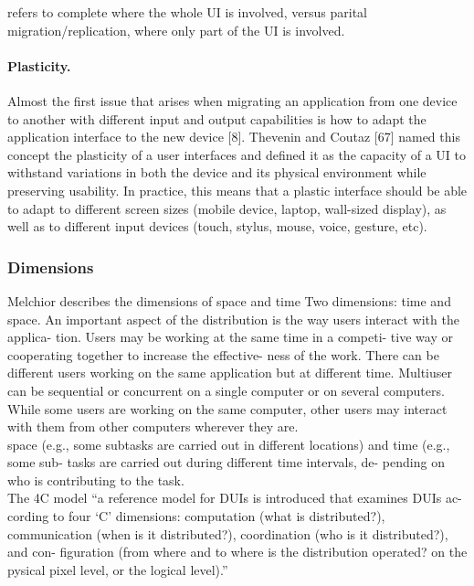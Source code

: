 \cite{blumendorf2011distributed} refers to complete where the whole UI is
involved,  versus parital migration/replication, where only part of the UI is
involved.

\paragraph{Plasticity.}
\cite{elmqvist2011distributed} Almost the first issue that arises when migrating
an application from one device to another with different input and output capabilities is how to adapt the application interface to the new device [8]. Thevenin and Coutaz [67] named this concept the plasticity of a user interfaces and defined it as the capacity of a UI to withstand variations in both the device and its physical environment while preserving usability. In practice, this means that a plastic interface should be able to adapt to different screen sizes (mobile device, laptop, wall-sized display), as well as to different input devices (touch, stylus, mouse, voice, gesture, etc).

\subsubsection{Dimensions}

\cite{melchior2011distributed} Melchior describes the dimensions of space and
time Two dimensions: time and space. An important aspect of the distribution is
the way users interact with the applica- tion. Users may be working at the same
time in a competi- tive way or cooperating together to increase the effective-
ness of the work. There can be different users working on the same application but at different time. Multiuser can be sequential or concurrent on a single computer or on several computers. While some users are working on the same computer, other users may interact with them from other computers wherever they are.\\
\cite{melchior2011distributed} space (e.g., some subtasks are carried out in
different locations) and time (e.g., some sub- tasks are carried out during
different time intervals, de- pending on who is contributing to the task. \\


\cite{demeure20084c} The 4C model ``a reference model for DUIs is introduced
that examines DUIs ac- cording to four ‘C’ dimensions: computation (what is
distributed?), communication (when is it distributed?), coordination (who is it
distributed?), and con- figuration (from where and to where is the distribution
operated? on the pysical pixel level, or the logical level).''\\

